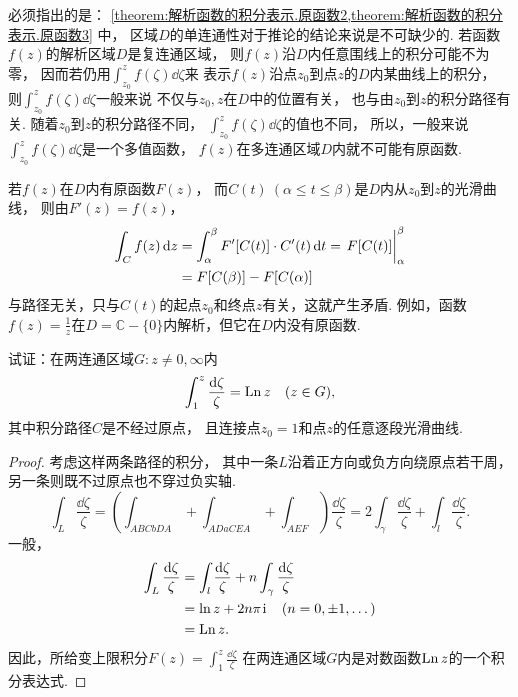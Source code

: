 必须指出的是：
\cref{theorem:解析函数的积分表示.原函数2,theorem:解析函数的积分表示.原函数3} 中，
区域\(D\)的单连通性对于推论的结论来说是不可缺少的.
若函数\(f(z)\)的解析区域\(D\)是复连通区域，
则\(f(z)\)沿\(D\)内任意围线上的积分可能不为零，
因而若仍用\(\int_{z_0}^z f(\zeta) \dd{\zeta}\)来
表示\(f(z)\)沿点\(z_0\)到点\(z\)的\(D\)内某曲线上的积分，
则\(\int_{z_0}^z f(\zeta) \dd{\zeta}\)一般来说
不仅与\(z_0,z\)在\(D\)中的位置有关，
也与由\(z_0\)到\(z\)的积分路径有关.
随着\(z_0\)到\(z\)的积分路径不同，
\(\int_{z_0}^z f(\zeta) \dd{\zeta}\)的值也不同，
所以，一般来说\(\int_{z_0}^z f(\zeta) \dd{\zeta}\)是一个多值函数，
\(f(z)\)在多连通区域\(D\)内就不可能有原函数.

若\(f(z)\)在\(D\)内有原函数\(F(z)\)，
而\(C(t)\ (\alpha\leq t \leq\beta)\)是\(D\)内从\(z_0\)到\(z\)的光滑曲线，
则由\(F'(z) = f(z)\)，
\begin{align*}
	\int_C f(z) \dd{z}
	&= \int_\alpha^\beta F'[C(t)] \cdot C'(t) \dd{t}
	= \eval{F[C(t)]}_\alpha^\beta \\
	&= F[C(\beta)] - F[C(\alpha)]
\end{align*}
与路径无关，只与\(C(t)\)的起点\(z_0\)和终点\(z\)有关，这就产生矛盾.
例如，函数\(f(z) = \frac{1}{z}\)在\(D=\mathbb{C}-\{0\}\)内解析，但它在\(D\)内没有原函数.
\begin{example}%
\def\f{\frac{\dd{\zeta}}{\zeta}}
试证：在两连通区域\(G: z\neq0,\infty\)内\[
	\int_1^z \f
	= \Ln z
	\quad (z \in G),
\]
其中积分路径\(C\)是不经过原点，
且连接点\(z_0=1\)和点\(z\)的任意逐段光滑曲线.
\begin{proof}
考虑这样两条路径的积分，
其中一条\(L\)沿着正方向或负方向绕原点若干周，
另一条则既不过原点也不穿过负实轴.
\[
	\int_L \f
	= \left(\int_{ABCbDA} + \int_{ADaCEA} + \int_{AEF}\right) \f
	= 2 \int_\gamma \f + \int_l \f.
\]
一般，\begin{align*}
	\int_L \f
	&= \int_l \f + n \int_\gamma \f \\
	&= \ln z + 2n\pi\iu \quad(n=0,\pm1,\dotsc) \\
	&= \Ln z.
\end{align*}
因此，所给变上限积分\(F(z) = \int_1^z \f\)
在两连通区域\(G\)内是对数函数\(\operatorname{Ln} z\)的一个积分表达式.
\end{proof}
\end{example}
